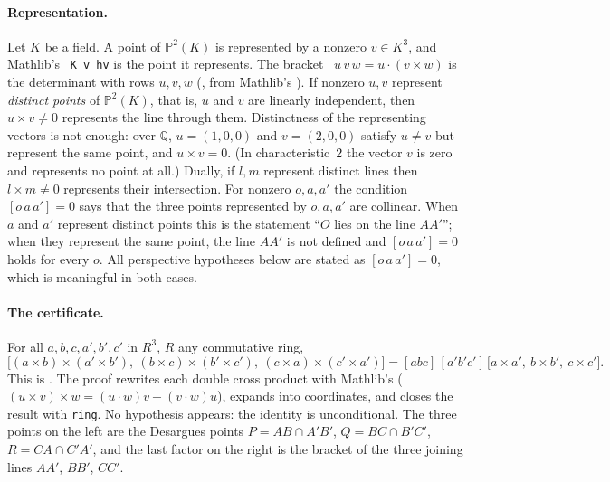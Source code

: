 \documentclass[11pt]{article}
\theoremstyle{definition}
\theoremstyle{remark}
\newcommand{\lean}[1]{\texttt{#1}}
\newcommand{\QQ}{\mathbb{Q}}
\newcommand{\PP}{\mathbb{P}}
\begin{document}
\paragraph{Representation.} Let $K$ be a field. A point of $\PP^2(K)$ is represented by a nonzero
$v\in K^3$, and Mathlib's ~\lean{K v hv} is the point it represents. The
bracket ~$u\,v\,w=u\cdot(v\times w)$ is the determinant with rows $u,v,w$
(, from Mathlib's ). If nonzero $u,v$
represent \emph{distinct points} of $\PP^2(K)$, that is, $u$ and $v$ are linearly independent,
then $u\times v\ne0$ represents the line through them. Distinctness of the representing vectors
is not enough: over $\QQ$, $u=(1,0,0)$ and $v=(2,0,0)$ satisfy $u\ne v$ but represent the same point, and
$u\times v=0$. (In characteristic~$2$ the vector $v$ is zero and represents no point at all.) Dually, if $l,m$ represent distinct lines then $l\times m\ne0$ represents their
intersection. For nonzero $o,a,a'$ the condition $[o\,a\,a']=0$ says that the three points
represented by $o,a,a'$ are collinear. When $a$ and $a'$ represent distinct points this is the
statement ``$O$ lies on the line $AA'$''; when they represent the same point, the line $AA'$ is
not defined and $[o\,a\,a']=0$ holds for every $o$. All perspective hypotheses below are stated
as $[o\,a\,a']=0$, which is meaningful in both cases.

\paragraph{The certificate.} For all $a,b,c,a',b',c'$ in $R^3$, $R$ any commutative ring,
\begin{equation}\label{eq:des}
\bigl[(a\times b)\times(a'\times b'),\ (b\times c)\times(b'\times c'),\ (c\times a)\times(c'\times a')\bigr]
 = [abc]\,[a'b'c']\,\bigl[a\times a',\ b\times b',\ c\times c'\bigr].
\end{equation}
This is . The proof rewrites each double cross product with
Mathlib's  ($(u\times v)\times w=(u\cdot w)v-(v\cdot w)u$),
expands into coordinates, and closes the result with \lean{ring}. No hypothesis appears: the
identity is unconditional. The three points on the left are the Desargues points
$P=AB\cap A'B'$, $Q=BC\cap B'C'$, $R=CA\cap C'A'$, and the last factor on the right is the bracket
of the three joining lines $AA'$, $BB'$, $CC'$.
\end{document}
